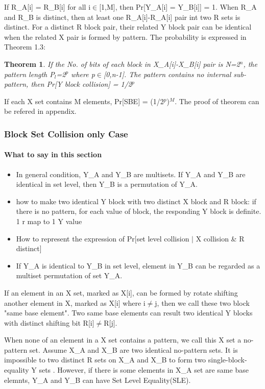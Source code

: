 \documentclass{article}
\newtheorem{theorem}{Theorem}[section]
\begin{document}
If R\_A[i] = R\_B[i] for all i$\in$[1,M], then Pr[Y\_A[i] = Y\_B[i]] = 1. When R\_A and R\_B is distinct, then at least one R\_A[i]-R\_A[i] pair int two R sets is distinct. For a distinct R block pair, their related Y block pair can be identical when the related X pair is formed by pattern. The probability is expressed in Theorem 1.3:
\begin{theorem}
If the No. of bits of each block in X\_A[i]-X\_B[i] pair is N=2$^n$, the pattern length P$_l$=2$^p$ where p$\in$[0,n-1]. The pattern contains no internal sub-pattern, then Pr[Y block collision] = 1/2$^p$
\end{theorem}
If each X set contains M elements, Pr[SBE] = (1/2$^p$)$^M$.
The proof of theorem can be refered in appendix.

\subsubsection{Block Set Collision only Case}
\paragraph{What to say in this section}
\begin{itemize}
	\item In general condition, Y\_A and Y\_B are multisets. If Y\_A and Y\_B are identical in set level, then Y\_B is a permutation of Y\_A.
	\item how to make two identical Y block with two distinct X block and R block: if there is no pattern, for each value of block, the responding Y block is definite. 1 r map to 1 Y value
	\item How to represent the expression of Pr[set level collision $\mid$ X collision \& R distinct]
	\item If Y\_A is identical to Y\_B in set level, element in Y\_B can be regarded as a multiset permutation of set Y\_A.
\end{itemize}

If an element in an X set, marked as X[i], can be formed by rotate shifting another element in X, marked as X[i] where i$\neq$j, then we call these two block "same base element". Two same base elements can result two identical Y blocks with distinct shifting bit R[i]$\neq$R[j]. 

When none of an element in a X set contains a pattern, we call this X set a no-pattern set. Assume X\_A and X\_B are two identical no-pattern sets. It is impossible to two distinct R sets on X\_A and X\_B to form two single-block-equality Y sets . However, if there is some elements in X\_A set are same base elemnts, Y\_A and Y\_B can have Set Level Equality(SLE). 
\end{document}
